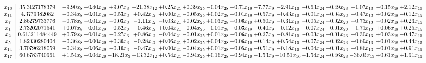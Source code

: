 \documentclass[9pt]{article}
\begin{document}
 \[\begin{array}{c| c c@{\hskip 2pt} c@{\hskip 2pt} c@{\hskip 2pt} c@{\hskip 2pt} c@{\hskip 2pt} c@{\hskip 2pt} c@{\hskip 2pt} c@{\hskip 2pt} c@{\hskip 2pt} c@{\hskip 2pt} c@{\hskip 2pt} c@{\hskip 2pt} c@{\hskip 2pt} c@{\hskip 2pt} c@{\hskip 2pt} }
 x_{16}   &  35.3127178379 & -9.90 x_{8} & +  0.40 x_{29} & +  9.07 x_{3} & -21.38 x_{12} & +  0.25 x_{21} & +  0.39 x_{25} & -0.04 x_{28} & +  0.71 x_{19} & -7.77 x_{9} & -2.91 x_{10} & +  0.63 x_{24} & +  0.49 x_{23} & -1.07 x_{13} & -0.15 x_{18} & +  2.12 x_{15}\\
 x_{11}   &  4.3779382082 & -0.34 x_{8} & -0.01 x_{29} & -0.53 x_{3} & +  0.42 x_{12} & +  0.00 x_{21} & -0.05 x_{25} & +  0.02 x_{28} & +  0.01 x_{19} & -0.57 x_{9} & -0.43 x_{10} & +  0.01 x_{24} & -0.04 x_{23} & -0.47 x_{13} & +  0.02 x_{18} & -0.12 x_{15}\\
 x_{7}   &  2.86279733776 & -0.78 x_{8} & -0.01 x_{29} & -0.03 x_{3} & -1.11 x_{12} & -0.03 x_{21} & +  0.02 x_{25} & +  0.03 x_{28} & +  0.06 x_{19} & +  0.50 x_{9} & -0.31 x_{10} & +  0.05 x_{24} & +  0.02 x_{23} & +  0.73 x_{13} & -0.02 x_{18} & +  0.23 x_{15}\\
 x_{1}   &  2.73202071541 & +  0.07 x_{8} & +  0.01 x_{29} & -0.52 x_{3} & -0.46 x_{12} & +  0.04 x_{21} & -0.04 x_{25} & -0.01 x_{28} & +  0.03 x_{19} & -0.40 x_{9} & -0.12 x_{10} & +  0.07 x_{24} & +  0.01 x_{23} & -1.71 x_{13} & +  0.06 x_{18} & +  0.25 x_{15}\\
 x_{2}   &  0.613211484449 & +  0.79 x_{8} & +  0.01 x_{29} & -0.27 x_{3} & +  0.86 x_{12} & -0.04 x_{21} & -0.01 x_{25} & +  0.01 x_{28} & -0.06 x_{19} & +  0.27 x_{9} & -0.81 x_{10} & -0.03 x_{24} & +  0.01 x_{23} & +  0.30 x_{13} & +  0.03 x_{18} & -0.47 x_{15}\\
 x_{5}   &  1.82030280404 & -0.36 x_{8} & -0.00 x_{29} & +  0.30 x_{3} & -0.28 x_{12} & +  0.06 x_{21} & +  0.02 x_{25} & +  0.04 x_{28} & +  0.06 x_{19} & -0.14 x_{9} & +  0.54 x_{10} & +  0.07 x_{24} & -0.02 x_{23} & -0.69 x_{13} & +  0.01 x_{18} & +  0.44 x_{15}\\
 x_{14}   &  3.70796218059 & -0.34 x_{8} & +  0.06 x_{29} & -0.10 x_{3} & -0.47 x_{12} & +  0.00 x_{21} & -0.04 x_{25} & +  0.01 x_{28} & +  0.05 x_{19} & -0.51 x_{9} & -0.18 x_{10} & +  0.04 x_{24} & +  0.01 x_{23} & -0.86 x_{13} & -0.01 x_{18} & +  0.91 x_{15}\\
 x_{17}   &  60.6783740961 & +  1.54 x_{8} & +  0.04 x_{29} & -18.21 x_{3} & -13.32 x_{12} & +  0.54 x_{21} & -0.94 x_{25} & +  0.16 x_{28} & +  0.94 x_{19} & -1.53 x_{9} & -10.51 x_{10} & +  1.54 x_{24} & -0.46 x_{23} & -36.05 x_{13} & +  0.61 x_{18} & +  1.91 x_{15}\\

\end{array}\]
\end{document}
